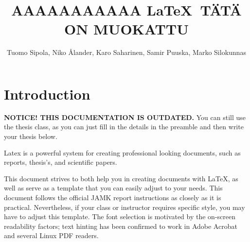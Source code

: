 \documentclass[english]{jamk-report}
\title{AAAAAAAAAAA \LaTeX\ TÄTÄ ON MUOKATTU}
\author{Tuomo Sipola, Niko Ålander, Karo Saharinen, Samir Puuska, Marko Silokunnas}
\begin{document}


\frontmatter

\maketitle

\abstractpage
\abstractpagefi


\mainmatter

\tableofcontents  %

\listoffigures    %
\listoftables     %

\clearpage

\printacronyms[include=acro,name=Acronyms]

\clearpage




\section{Introduction}

\textbf{NOTICE! THIS DOCUMENTATION IS OUTDATED.} You can still use the thesis class, as you can just fill in the details in the preamble and then write your thesis below.

Latex is a powerful system for creating professional looking documents, such as reports, thesis's, and
scientific papers.

This document strives to both help you in creating documents with \LaTeX, %
as well as serve as a template that you can easily adjust to your needs.
This document follows the official JAMK report instructions as closely
as it is practical. Nevertheless, if your class or instructor requires
specific style, you may have to adjust this template. The font selection
is motivated by the on-screen readability factors; text hinting has
been confirmed to work in Adobe Acrobat and several Linux PDF readers.
\end{document}
